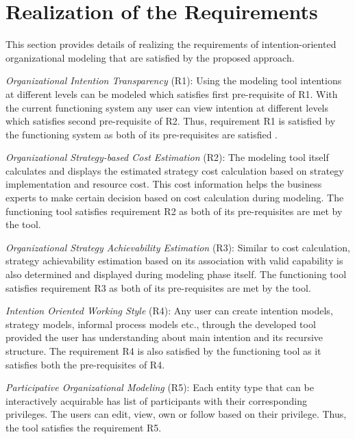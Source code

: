 		
\section{Realization of the Requirements}
\label{sec:validation}
This section provides details of realizing the requirements of intention-oriented organizational modeling that are satisfied by the proposed approach. 

\textit{Organizational Intention Transparency} (R1):  Using the modeling tool intentions at different levels can be modeled which satisfies first pre-requisite of R1. With the current functioning system any user can view intention at different levels which satisfies second pre-requisite of R2. Thus, requirement R1 is satisfied by the functioning system as both of its pre-requisites are satisfied .

\textit{Organizational Strategy-based Cost Estimation} (R2): The modeling tool itself calculates and displays the estimated strategy cost calculation based on strategy implementation and resource cost. This cost information helps the business experts to make certain decision based on cost calculation during modeling. The functioning tool satisfies requirement R2 as both of its pre-requisites are met by the tool. 

\textit{Organizational Strategy Achievability Estimation} (R3): Similar to cost calculation, strategy achievability estimation based on its association with valid capability is also determined and displayed during modeling phase itself. The functioning tool satisfies requirement R3 as both of its pre-requisites are met by the tool.

\textit{Intention Oriented Working Style} (R4): Any user can create intention models, strategy models, informal process models etc., through the developed tool provided the user has understanding about main intention and its recursive structure. The requirement R4 is also satisfied by the functioning tool as it satisfies both the pre-requisites of R4.

\textit{Participative Organizational Modeling} (R5): Each entity type that can be interactively acquirable has list of participants with their corresponding privileges. The users can edit, view, own or follow based on their privilege. Thus, the tool satisfies the requirement R5.

